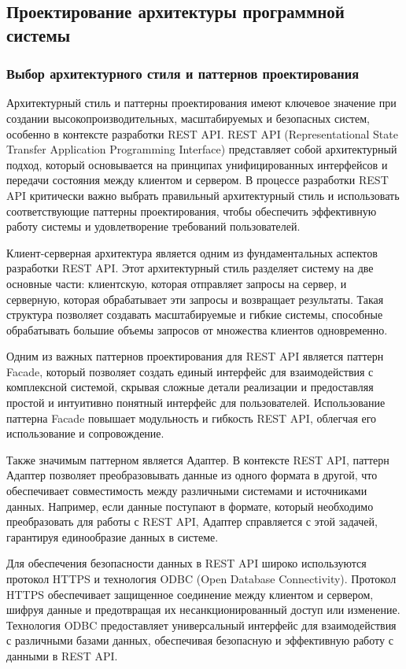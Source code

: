 \subsection{Проектирование архитектуры программной системы}

\subsubsection{Выбор архитектурного стиля и паттернов проектирования}

Архитектурный стиль и паттерны проектирования имеют ключевое значение при создании высокопроизводительных, масштабируемых и безопасных систем, особенно в контексте разработки REST API. REST API (Representational State Transfer Application Programming Interface) представляет собой архитектурный подход, который основывается на принципах унифицированных интерфейсов и передачи состояния между клиентом и сервером. В процессе разработки REST API критически важно выбрать правильный архитектурный стиль и использовать соответствующие паттерны проектирования, чтобы обеспечить эффективную работу системы и удовлетворение требований пользователей.

Клиент-серверная архитектура является одним из фундаментальных аспектов разработки REST API. Этот архитектурный стиль разделяет систему на две основные части: клиентскую, которая отправляет запросы на сервер, и серверную, которая обрабатывает эти запросы и возвращает результаты. Такая структура позволяет создавать масштабируемые и гибкие системы, способные обрабатывать большие объемы запросов от множества клиентов одновременно.

Одним из важных паттернов проектирования для REST API является паттерн Facade, который позволяет создать единый интерфейс для взаимодействия с комплексной системой, скрывая сложные детали реализации и предоставляя простой и интуитивно понятный интерфейс для пользователей. Использование паттерна Facade повышает модульность и гибкость REST API, облегчая его использование и сопровождение.

Также значимым паттерном является Адаптер. В контексте REST API, паттерн Адаптер позволяет преобразовывать данные из одного формата в другой, что обеспечивает совместимость между различными системами и источниками данных. Например, если данные поступают в формате, который необходимо преобразовать для работы с REST API, Адаптер справляется с этой задачей, гарантируя единообразие данных в системе.

Для обеспечения безопасности данных в REST API широко используются протокол HTTPS и технология ODBC (Open Database Connectivity). Протокол HTTPS обеспечивает защищенное соединение между клиентом и сервером, шифруя данные и предотвращая их несанкционированный доступ или изменение. Технология ODBC предоставляет универсальный интерфейс для взаимодействия с различными базами данных, обеспечивая безопасную и эффективную работу с данными в REST API.

